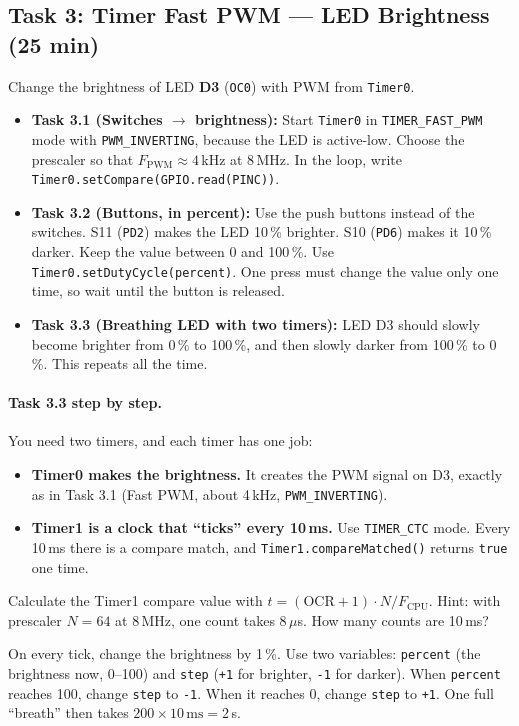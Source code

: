 \documentclass[11pt,a4paper]{article}
\newcommand{\code}[1]{\texttt{#1}}
\begin{document}
\subsection*{Task 3: Timer Fast PWM --- LED Brightness (25 min)}
Change the brightness of LED \textbf{D3} (\code{OC0}) with PWM from \code{Timer0}.
\begin{itemize}
  \item \textbf{Task 3.1 (Switches $\rightarrow$ brightness):} Start \code{Timer0}
        in \code{TIMER\_FAST\_PWM} mode with \code{PWM\_INVERTING}, because the
        LED is active-low. Choose the prescaler so that
        $F_{\text{PWM}} \approx 4$\,kHz at 8\,MHz. In the loop, write
        \code{Timer0.setCompare(GPIO.read(PINC))}.
  \item \textbf{Task 3.2 (Buttons, in percent):} Use the push buttons instead of
        the switches. S11 (\code{PD2}) makes the LED 10\,\% brighter. S10
        (\code{PD6}) makes it 10\,\% darker. Keep the value between 0 and
        100\,\%. Use \code{Timer0.setDutyCycle(percent)}. One press must change
        the value only one time, so wait until the button is released.
  \item \textbf{Task 3.3 (Breathing LED with two timers):} LED D3 should slowly
        become brighter from 0\,\% to 100\,\%, and then slowly darker from
        100\,\% to 0\,\%. This repeats all the time.
\end{itemize}

\paragraph{Task 3.3 step by step.} You need two timers, and each timer has
one job:
\begin{itemize}
  \item \textbf{Timer0 makes the brightness.} It creates the PWM signal on D3,
        exactly as in Task 3.1 (Fast PWM, about 4\,kHz, \code{PWM\_INVERTING}).
  \item \textbf{Timer1 is a clock that ``ticks'' every 10\,ms.} Use
        \code{TIMER\_CTC} mode. Every 10\,ms there is a compare match, and
        \code{Timer1.compareMatched()} returns \code{true} one time.
\end{itemize}
Calculate the Timer1 compare value with $t = (\text{OCR} + 1) \cdot N / F_{\text{CPU}}$.
Hint: with prescaler $N = 64$ at 8\,MHz, one count takes $8\,\mu$s. How many
counts are 10\,ms?

On every tick, change the brightness by 1\,\%. Use two variables:
\code{percent} (the brightness now, 0--100) and \code{step} (\code{+1} for
brighter, \code{-1} for darker). When \code{percent} reaches 100, change
\code{step} to \code{-1}. When it reaches 0, change \code{step} to \code{+1}.
One full ``breath'' then takes $200 \times 10\,\text{ms} = 2$\,s.
\end{document}

